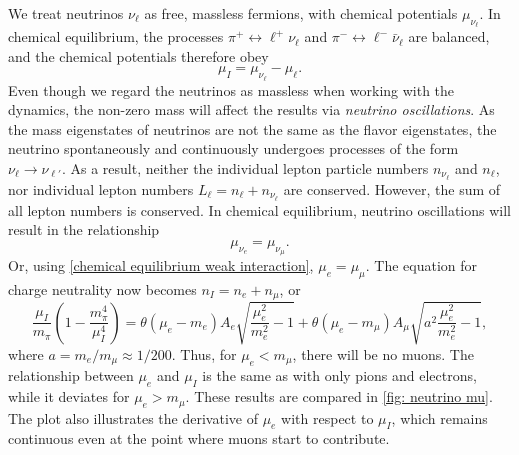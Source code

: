 We treat neutrinos $\nu_\ell$ as free, massless fermions, with chemical potentials $\mu_{\nu_\ell}$.
In chemical equilibrium, the processes $\pi^+ \leftrightarrow \ell^+ \nu_\ell $ and $\pi^- \leftrightarrow \ell^- \bar\nu_\ell $ are balanced, and the chemical potentials therefore obey
%
\begin{equation}
    \label{chemical equilibrium weak interaction}
    \mu_I = \mu_{\nu_\ell} - \mu_\ell.
\end{equation}
%
Even though we regard the neutrinos as massless when working with the dynamics, the non-zero mass will affect the results via \emph{neutrino oscillations}.
As the mass eigenstates of neutrinos are not the same as the flavor eigenstates, the neutrino spontaneously and continuously undergoes processes of the form $\nu_\ell \rightarrow \nu_{\ell'}$.
As a result, neither the individual lepton particle numbers $n_{\nu_\ell}$ and $n_{\ell}$, nor individual lepton numbers $L_\ell = n_\ell + n_{\nu_\ell}$ are conserved.
However, the sum of all lepton numbers is conserved.
In chemical equilibrium, neutrino oscillations will result in the relationship
%
\begin{equation}
    \mu_{\nu_e} = \mu_{\nu_\mu}.
\end{equation}
%
Or, using \autoref{chemical equilibrium weak interaction}, $\mu_e = \mu_\mu$.
The equation for charge neutrality now becomes $n_I = n_e + n_\mu$, or
%
\begin{equation}
    \label{chemical potential relationship neutrinos}
    \frac{\mu_I}{m_\pi} \left(1 - \frac{m_\pi^4}{\mu_I^4}\right)
    =
    \theta(\mu_e - m_e) 
    A_e \sqrt{\frac{\mu_e^2}{m_e^2} - 1}
    +
    \theta(\mu_e - m_\mu)
    A_\mu \sqrt{a^2 \frac{\mu_e^2}{m_e^2} - 1},
\end{equation}
%
where $a = m_e/m_\mu \approx 1 / 200$.
Thus, for $\mu_e < m_\mu$, there will be no muons. 
The relationship between $\mu_e$ and $\mu_I$ is the same as with only pions and electrons, while it deviates for $\mu_e > m_\mu$.
These results are compared in \autoref{fig: neutrino mu}.
The plot also illustrates the derivative of $\mu_e$ with respect to $\mu_I$, which remains continuous even at the point where muons start to contribute.

